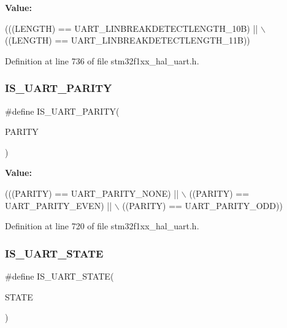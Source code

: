 {\bfseries Value\+:}
\begin{DoxyCode}
(((LENGTH) == UART\_LINBREAKDETECTLENGTH\_10B) || \(\backslash\)
                                                 ((LENGTH) == UART\_LINBREAKDETECTLENGTH\_11B))
\end{DoxyCode}


Definition at line 736 of file stm32f1xx\+\_\+hal\+\_\+uart.\+h.

\mbox{\label{group___u_a_r_t___private___macros_gaf2f542d273738ee3cb4a93d169827744}} 
\subsubsection{\texorpdfstring{I\+S\+\_\+\+U\+A\+R\+T\+\_\+\+P\+A\+R\+I\+TY}{IS\_UART\_PARITY}}
{\footnotesize\ttfamily \#define I\+S\+\_\+\+U\+A\+R\+T\+\_\+\+P\+A\+R\+I\+TY(\begin{DoxyParamCaption}\item[{}]{P\+A\+R\+I\+TY }\end{DoxyParamCaption})}

{\bfseries Value\+:}
\begin{DoxyCode}
(((PARITY) == UART\_PARITY\_NONE) || \(\backslash\)
                                ((PARITY) == UART\_PARITY\_EVEN) || \(\backslash\)
                                ((PARITY) == UART\_PARITY\_ODD))
\end{DoxyCode}


Definition at line 720 of file stm32f1xx\+\_\+hal\+\_\+uart.\+h.

\mbox{\label{group___u_a_r_t___private___macros_ga202315393e18f29b20eb49ad9f8934dd}} 
\subsubsection{\texorpdfstring{I\+S\+\_\+\+U\+A\+R\+T\+\_\+\+S\+T\+A\+TE}{IS\_UART\_STATE}}
{\footnotesize\ttfamily \#define I\+S\+\_\+\+U\+A\+R\+T\+\_\+\+S\+T\+A\+TE(\begin{DoxyParamCaption}\item[{}]{S\+T\+A\+TE }\end{DoxyParamCaption})}

